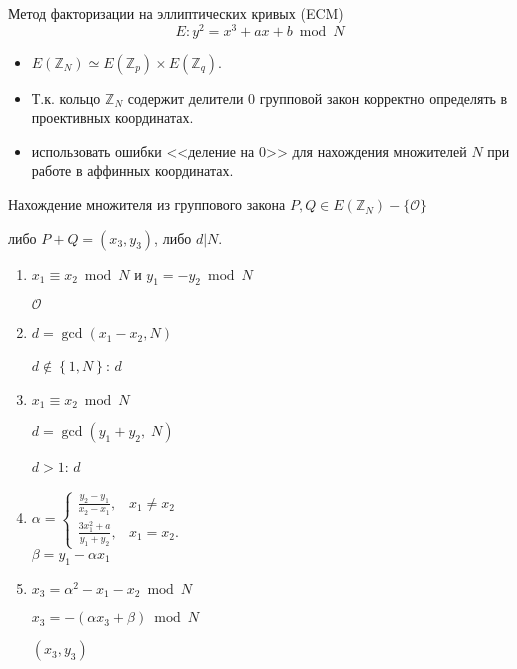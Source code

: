 \documentclass{beamer}
\begin{document}
\begin{frame}{Метод факторизации на эллиптических кривых (ECM)}
\[E: y^2 = x^3 + a x + b \bmod N\]
\begin{itemize}
    \item $E(\mathbb{Z}_N) \simeq E(\mathbb{Z}_p) \times E(\mathbb{Z}_q)$.
    \item Т.к. кольцо $\mathbb{Z}_N$ содержит делители $0$ групповой закон корректно определять в проективных координатах.
    \item {} использовать ошибки <<деление на $0$>> для нахождения множителей $N$ при работе в аффинных координатах.
\end{itemize}
\end{frame}

\begin{frame}{Нахождение множителя из группового закона}
     $P, Q \in E( \mathbb{Z}_N ) - \{\mathcal{O}\}$
    
     либо $P + Q = ( x_3,y_3 )$, либо $d|N$. 
    
    \begin{enumerate}
        \item {} $x_1 \equiv x_2\bmod N$ и $y_1 =  - y_2\bmod N$
        
        \quad {} $\mathcal{O}$
        
        \item $d = \gcd(x_1 - x_2, N)$

        \quad {} $d\not  \in \left\{1,N\right\}$:  $d$
        
        \item {} $x_1 \equiv x_2\bmod N$
        
        \quad $d = \gcd (y_1 + y_2,\;N)$
        
        \quad {} $d > 1$:  $d$
        
        \item 
        $
        \alpha =
        \begin{cases}
             \frac{y_2 - y_1}{x_2 - x_1},& x_1 \ne x_2 \\
            \frac{3x_1^2 + a}{y_1 + y_2},& x_1 = x_2.
        \end{cases}
        $\\
        $
        \beta  = y_1 - \alpha x_1
        $
        
        \item $x_3 = \alpha ^2 - x_1 - x_2\bmod N$
        
        $x_3 =  - ( \alpha x_3 + \beta  )\bmod N$
        
         $( x_3, y_3 )$
        
    \end{enumerate}
\end{frame}
\end{document}
